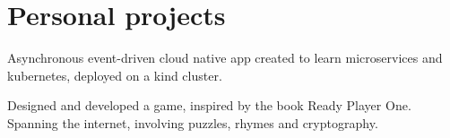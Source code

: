 \documentclass[]{font}
\begin{document}
\begin{minipage}[t]{0.66\textwidth}



\sectionsep



\section{Personal projects}

Asynchronous event-driven cloud native app created to learn microservices and kubernetes, deployed on a kind cluster.
\sectionsep

Designed and developed a game, inspired by the book Ready Player One. Spanning the internet, involving puzzles, rhymes and cryptography.
\sectionsep



\end{minipage} 
\end{document}
